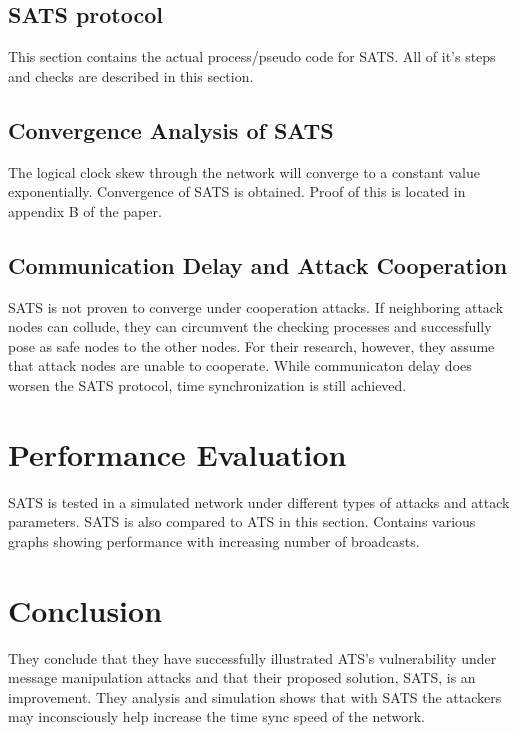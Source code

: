 \documentclass{article}
\begin{document}
\subsection{SATS protocol}
This section contains the actual process/pseudo code for SATS. All of it's steps and checks are described in this section. 

\subsection{Convergence Analysis of SATS}
The logical clock skew through the network will converge to a constant value exponentially. Convergence of SATS is obtained. Proof of this is located in appendix B of the paper.

\subsection{Communication Delay and Attack Cooperation}
SATS is not proven to converge under cooperation attacks. If neighboring attack nodes can collude, they can circumvent the checking processes and successfully pose as safe nodes to the other nodes. For their research, however, they assume that attack nodes are unable to cooperate. While communicaton delay does worsen the SATS protocol, time synchronization is still achieved.

\section{Performance Evaluation}
SATS is tested in a simulated network under different types of attacks and attack parameters. SATS is also compared to ATS in this section. Contains various graphs showing performance with increasing number of broadcasts.

\section{Conclusion}
They conclude that they have successfully illustrated ATS's vulnerability under message manipulation attacks and that their proposed solution, SATS, is an improvement. They analysis and simulation shows that with SATS the attackers may inconsciously help increase the time sync speed of the network.
    
\end{document}
